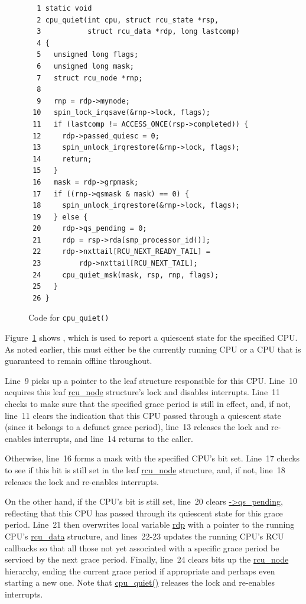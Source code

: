 \begin{figure}[tbp]
{ \scriptsize
\begin{verbatim}
  1 static void
  2 cpu_quiet(int cpu, struct rcu_state *rsp,
  3           struct rcu_data *rdp, long lastcomp)
  4 {
  5   unsigned long flags;
  6   unsigned long mask;
  7   struct rcu_node *rnp;
  8
  9   rnp = rdp->mynode;
 10   spin_lock_irqsave(&rnp->lock, flags);
 11   if (lastcomp != ACCESS_ONCE(rsp->completed)) {
 12     rdp->passed_quiesc = 0;
 13     spin_unlock_irqrestore(&rnp->lock, flags);
 14     return;
 15   }
 16   mask = rdp->grpmask;
 17   if ((rnp->qsmask & mask) == 0) {
 18     spin_unlock_irqrestore(&rnp->lock, flags);
 19   } else {
 20     rdp->qs_pending = 0;
 21     rdp = rsp->rda[smp_processor_id()];
 22     rdp->nxttail[RCU_NEXT_READY_TAIL] =
 23         rdp->nxttail[RCU_NEXT_TAIL];
 24     cpu_quiet_msk(mask, rsp, rnp, flags);
 25   }
 26 }
\end{verbatim}
}
\caption{Code for {\tt cpu\_quiet()}}
\label{fig:app:rcuimpl:rcutreewt:Code for cpu-quiet}
\end{figure}

Figure~\ref{fig:app:rcuimpl:rcutreewt:Code for cpu-quiet}
shows , which is used to report a quiescent state
for the specified CPU.
As noted earlier, this must either be the currently running CPU
or a CPU that is guaranteed to remain offline throughout.

Line~9 picks up a pointer to the leaf  structure
responsible for this CPU.
Line~10 acquires this leaf \url{rcu_node} structure's lock and
disables interrupts.
Line~11 checks to make sure that the specified grace period is
still in effect, and, if not, line~11 clears the indication that
this CPU passed through a quiescent state (since it belongs to
a defunct grace period), line~13 releases the lock and re-enables
interrupts, and line~14 returns to the caller.

Otherwise, line~16 forms a mask with the specified CPU's bit set.
Line~17 checks to see if this bit is still set in the leaf
\url{rcu_node} structure, and, if not, line~18 releases the lock
and re-enables interrupts.

On the other hand, if the CPU's bit is still set, line~20 clears
\url{->qs_pending}, reflecting that this CPU has passed through
its quiescent state for this grace period.
Line~21 then overwrites local variable \url{rdp} with a pointer to
the running CPU's \url{rcu_data} structure, and lines~22-23
updates the running CPU's RCU callbacks so that all those not yet
associated with a specific grace period
be serviced by the next grace period.
Finally, line~24 clears bits up the \url{rcu_node} hierarchy,
ending the current grace period if appropriate and perhaps even
starting a new one.
Note that \url{cpu_quiet()} releases the lock and re-enables interrupts.

